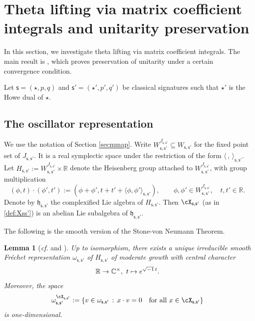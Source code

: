 \documentclass[11pt,a4paper]{amsart}
\newcommand{\h}{\mathfrak h}
\newcommand{\R}{\mathbb R}
\newcommand{\la}{\langle}
\newcommand{\ra}{\rangle}
\numberwithin{equation}{section}
\newtheorem{lem}[thm]{Lemma}
\theoremstyle{remark}
\def\subset{\subseteq}
\def\cf{\emph{cf.} }
\begin{document}
\section{Theta lifting via matrix coefficient integrals and unitarity preservation}\label{sec:Integrals}

In this section,
we investigate theta lifting via
matrix coefficient integrals. The main result is , which proves preservation of unitarity under a certain convergence condition.

Let $\mathsf s=(\star, p,q)$ and $ \mathsf s'=(\star', p',q')$ be classical signatures such that $\star'$ is the Howe dual of $\star$.

\subsection{The oscillator representation}\label{secoscil}
We use the notation of Section \ref{secmmap}. Write
$
  W_{\mathsf s, \mathsf s'}^{J_{\mathsf s, \mathsf s'}}\subset W_{\mathsf s, \mathsf s'}
$
for the fixed point set of $J_{\mathsf s, \mathsf s'}$. It is a real symplectic space under the restriction of the form $\la\,,\,\ra_{\mathsf s, \mathsf s'}$. Let $H_{\mathsf s, \mathsf s'}:= W_{\mathsf s, \mathsf s'}^{J_{\mathsf s, \mathsf s'}}\times \R$
denote the Heisenberg group attached to $W_{\mathsf s, \mathsf s'}^{J_{\mathsf s, \mathsf s'}}$, with group multiplication
\[
  (\phi ,t)\cdot (\phi ', t'):=(\phi +\phi ', t+t'+\la \phi , \phi '\ra_{\mathsf s, \mathsf s'}), \qquad \phi ,\phi '\in  W_{\mathsf s, \mathsf s'}^{J_{\mathsf s, \mathsf s'}}, \quad t, t'\in \R.
\]
Denote by $\h_{\mathsf s, \mathsf s'}$ the complexified Lie algebra of $H_{\mathsf s, \mathsf s'}$. Then  $\cX_{\mathsf s, \mathsf s'}$ (as in \eqref{def:Xss'}) is  an abelian Lie subalgebra of $\h_{\mathsf s, \mathsf s'}$.

The following is the smooth version of the Stone-von Neumann Theorem.

\begin{lem}[{\cf \cite[Theorem 5.1]{Cl89} and \cite[Section 4]{Ad07}}]\label{vn}
Up to isomorphism, there exists a unique irreducible smooth Fr\'echet representation $\omega_{\mathsf s, \mathsf s'}$ of $H_{\mathsf s, \mathsf s'}$ of moderate growth
with central character
\[
\R\rightarrow \C^\times, \ t\mapsto e^{\sqrt{-1}\, t}.
\]
Moreover, the space
\[
  \omega_{\mathsf s, \mathsf s'}^{\cX_{\mathsf s, \mathsf s'}}:=\{v\in \omega_{\mathsf s, \mathsf s'}\,:\, x \cdot v=0\quad \textrm{for all $x\in \cX_{\mathsf s, \mathsf s'}$}\}
\]
is one-dimensional.
\end{lem}
\end{document}
